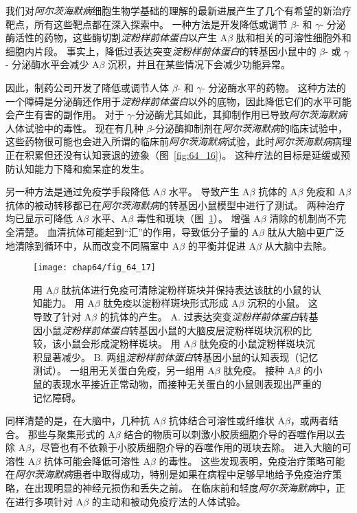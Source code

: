 我们对\textit{阿尔茨海默病}细胞生物学基础的理解的最新进展产生了几个有希望的新治疗靶点，所有这些靶点都在深入探索中。
一种方法是开发降低或调节 $\beta$- 和 $\gamma$- 分泌酶活性的药物，这些酶切割\textit{淀粉样前体蛋白}以产生 A$\beta$ 肽和相关的可溶性细胞外和细胞内片段。
事实上，降低过表达突变\textit{淀粉样前体蛋白}的转基因小鼠中的 $\beta$- 或 $\gamma$- 分泌酶水平会减少 A$\beta$ 沉积，并且在某些情况下会减少功能异常。


因此，制药公司开发了降低或调节人体 $\beta$- 和 $\gamma$- 分泌酶水平的药物。
这种方法的一个障碍是分泌酶还作用于\textit{淀粉样前体蛋白}以外的底物，因此降低它们的水平可能会产生有害的副作用。
对于 $\gamma$-分泌酶尤其如此，其抑制作用已导致\textit{阿尔茨海默病}人体试验中的毒性。
现在有几种 $\beta$-分泌酶抑制剂在\textit{阿尔茨海默病}的临床试验中，这些药物很可能也会进入所谓的临床前\textit{阿尔茨海默病}试验，此时\textit{阿尔茨海默病}病理正在积累但还没有认知衰退的迹象（图~\ref{fig:64_16})。
这种疗法的目标是延缓或预防认知能力下降和痴呆症的发生。


另一种方法是通过免疫学手段降低 A$\beta$ 水平。
导致产生 A$\beta$ 抗体的 A$\beta$ 免疫和 A$\beta$ 抗体的被动转移都已在\textit{阿尔茨海默病}的转基因小鼠模型中进行了测试。
两种治疗均已显示可降低 A$\beta$ 水平、A$\beta$ 毒性和斑块（图~\ref{fig:64_17}）。
增强 A$\beta$ 清除的机制尚不完全清楚。
血清抗体可能起到“汇”的作用，导致低分子量的 A$\beta$ 肽从大脑中更广泛地清除到循环中，从而改变不同隔室中 A$\beta$ 的平衡并促进 A$\beta$ 从大脑中去除。


\begin{figure}[htbp]
	\centering
	\texttt{[image: chap64/fig\_64\_17]}
	\caption{用 A$\beta$ 肽抗体进行免疫可清除淀粉样斑块并保持表达该肽的小鼠的认知能力。
		用 A$\beta$ 肽免疫以淀粉样斑块形式形成 A$\beta$ 沉积的小鼠。
		这导致了针对 A$\beta$ 的抗体的产生。
		A. 过表达突变\textit{淀粉样前体蛋白}转基因小鼠\textit{淀粉样前体蛋白}转基因小鼠的大脑皮层淀粉样斑块沉积的比较，该小鼠会形成淀粉样斑块。
		用 A$\beta$ 肽免疫的小鼠淀粉样斑块沉积显著减少\cite{brody2008active}。
		B. 两组\textit{淀粉样前体蛋白}转基因小鼠的认知表现（记忆测试）。
		一组用无关蛋白免疫，另一组用 A$\beta$ 肽免疫。
		接种 A$\beta$ 的小鼠的表现水平接近正常动物，而接种无关蛋白的小鼠则表现出严重的记忆障碍\cite{janus2000abeta}。}
	\label{fig:64_17}
\end{figure}


同样清楚的是，在大脑中，几种抗 A$\beta$ 抗体结合可溶性或纤维状 A$\beta$，或两者结合。
那些与聚集形式的 A$\beta$ 结合的物质可以刺激小胶质细胞介导的吞噬作用以去除 A$\beta$，尽管也有不依赖于小胶质细胞介导的吞噬作用的斑块去除。
进入大脑的可溶性 A$\beta$ 抗体可能会降低可溶性 A$\beta$ 的毒性。
这些发现表明，免疫治疗策略可能在\textit{阿尔茨海默病}患者中取得成功，特别是如果在病程中足够早地给予免疫治疗策略，在出现明显的神经元损伤和丢失之前。
在临床前和轻度\textit{阿尔茨海默病}中，正在进行多项针对 A$\beta$ 的主动和被动免疫疗法的人体试验。


